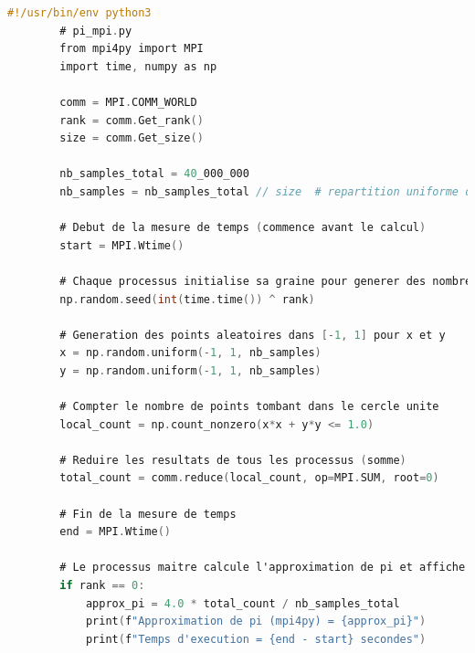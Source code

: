 \documentclass[a4paper,13pt]{book}
\begin{document}
	\begin{lstlisting}[language=C]
        #!/usr/bin/env python3
        # pi_mpi.py
        from mpi4py import MPI
        import time, numpy as np
        
        comm = MPI.COMM_WORLD
        rank = comm.Get_rank()
        size = comm.Get_size()
        
        nb_samples_total = 40_000_000
        nb_samples = nb_samples_total // size  # repartition uniforme des echantillons
        
        # Debut de la mesure de temps (commence avant le calcul)
        start = MPI.Wtime()
        
        # Chaque processus initialise sa graine pour generer des nombres aleatoires differents
        np.random.seed(int(time.time()) ^ rank)
        
        # Generation des points aleatoires dans [-1, 1] pour x et y
        x = np.random.uniform(-1, 1, nb_samples)
        y = np.random.uniform(-1, 1, nb_samples)
        
        # Compter le nombre de points tombant dans le cercle unite
        local_count = np.count_nonzero(x*x + y*y <= 1.0)
        
        # Reduire les resultats de tous les processus (somme)
        total_count = comm.reduce(local_count, op=MPI.SUM, root=0)
        
        # Fin de la mesure de temps
        end = MPI.Wtime()
        
        # Le processus maitre calcule l'approximation de pi et affiche le temps d'execution
        if rank == 0:
            approx_pi = 4.0 * total_count / nb_samples_total
            print(f"Approximation de pi (mpi4py) = {approx_pi}")
            print(f"Temps d'execution = {end - start} secondes")
        
        
\end{lstlisting}
\end{document}
